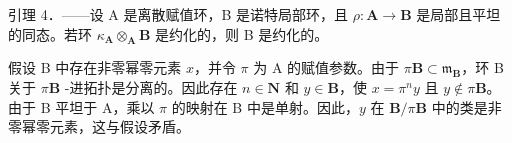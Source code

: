 引理 4．——设 A 是离散赋值环，B 是诺特局部环，且 \(\rho: \mathbf{A} \to \mathbf{B}\) 是局部且平坦的同态。若环 \(\kappa_{\mathbf{A}} \otimes_{\mathbf{A}} \mathbf{B}\) 是约化的，则 B 是约化的。

假设 B 中存在非零幂零元素 \(x\)，并令 \(\pi\) 为 A 的赋值参数。由于 \(\pi \mathbf{B} \subset \mathfrak{m}_{\mathbf{B}}\)，环 B 关于 \(\pi \mathbf{B}\) -进拓扑是分离的。因此存在 \(n \in \mathbf{N}\) 和 \(y \in \mathbf{B}\)，使 \(x = \pi^n y\) 且 \(y \notin \pi \mathbf{B}\)。由于 B 平坦于 A，乘以 \(\pi\) 的映射在 B 中是单射。因此，\(y\) 在 \(\mathbf{B}/\pi \mathbf{B}\) 中的类是非零幂零元素，这与假设矛盾。
